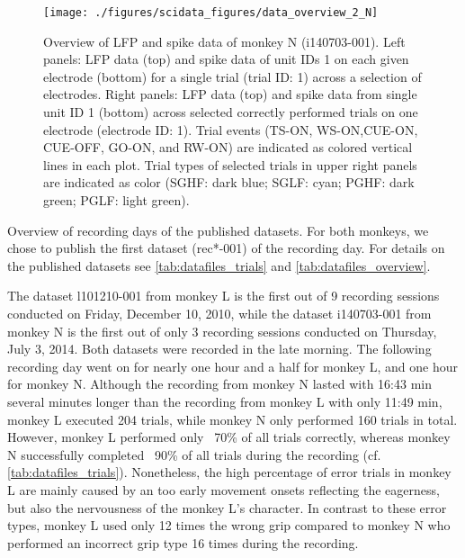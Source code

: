 {\begin{figure}
 \texttt{[image: ./figures/scidata\_figures/data\_overview\_2\_N]}
 \caption[Overview of LFP and spike data of monkey N (i140703-001)]{Overview of LFP and spike data of monkey N (i140703-001). Left panels: LFP data (top) and spike data of unit IDs 1 on each given electrode (bottom) for a single trial (trial ID: 1) across a selection of electrodes. Right panels: LFP data (top) and spike data from single unit ID 1 (bottom) across selected correctly performed trials on one electrode (electrode ID: 1). Trial events (TS-ON, WS-ON,CUE-ON, CUE-OFF, GO-ON, and RW-ON) are indicated as colored vertical lines in each plot. Trial types of selected trials in upper right panels are indicated as color (SGHF: dark blue; SGLF: cyan; PGHF: dark green; PGLF: light green).}
 \label{fig:overview_data_n_2}
\end{figure}



Overview of recording days of the published datasets. For both monkeys, we chose to publish the first dataset (rec*-001) of the recording day. For details on the published datasets see \cref{tab:datafiles_trials} and \cref{tab:datafiles_overview}.

The dataset l101210-001 from monkey L is the first out of 9 recording sessions conducted on Friday, December 10, 2010, while the dataset i140703-001 from monkey N is the first out of only 3 recording sessions conducted on Thursday, July 3, 2014. Both datasets were recorded in the late morning. The following recording day went on for nearly one hour and a half for monkey L, and one hour for monkey N. Although the recording from monkey N lasted with 16:43 min several minutes longer than the recording from monkey L with only 11:49 min, monkey L executed 204 trials, while monkey N only performed 160 trials in total. However, monkey L performed only ~70\% of all trials correctly, whereas monkey N successfully completed ~90\% of all trials during the recording (cf. \cref{tab:datafiles_trials}). Nonetheless, the high percentage of error trials in monkey L are mainly caused by an too early movement onsets reflecting the eagerness, but also the nervousness of the monkey L's character. In contrast to these error types, monkey L used only 12 times the wrong grip compared to monkey N who performed an incorrect grip type 16 times during the recording. 

}
